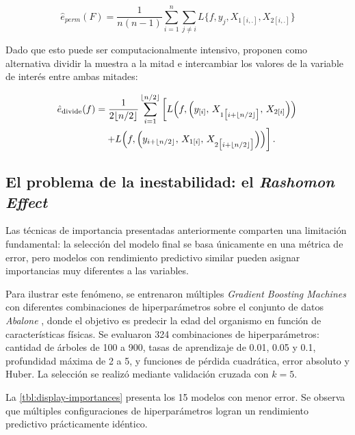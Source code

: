 \begin{equation}
    \hat{e}_{perm}(F) = \frac{1}{n(n-1)}\sum_{i=1}^n\sum_{j\neq i}L\{f,y_j,X_{1[i,.]},X_{2[i,.]} \}
\end{equation}

Dado que esto puede ser computacionalmente intensivo, proponen como alternativa dividir la muestra a la mitad e intercambiar los valores de la variable de interés entre ambas mitades:

\begin{equation}
    \begin{aligned}
    \hat{e}_{\text{divide}}(f) &= \frac{1}{2 \lfloor n/2 \rfloor} \sum_{i=1}^{\lfloor n/2 \rfloor} \left[
    L\Bigl(f,\Bigl(y_{[i]},\, X_{1\bigl[i+\lfloor n/2 \rfloor\bigr]},\, X_{2[i]}\Bigr)\Bigr) \right. \\
    &\left. \quad + L\Bigl(f,\Bigl(y_{i+\lfloor n/2 \rfloor},\, X_{1[i]},\, X_{2\bigl[i+\lfloor n/2 \rfloor\bigr]}\Bigr)\Bigr)
    \right]. \\
    \end{aligned}    
\end{equation}

\subsection{El problema de la inestabilidad: el \textit{Rashomon Effect}}

Las técnicas de importancia presentadas anteriormente comparten una limitación fundamental: la selección del modelo final se basa únicamente en una métrica de error, pero modelos con rendimiento predictivo similar pueden asignar importancias muy diferentes a las variables.

Para ilustrar este fenómeno, se entrenaron múltiples \textit{Gradient Boosting Machines} con diferentes combinaciones de hiperparámetros sobre el conjunto de datos \textit{Abalone} \cite{abalone_1}, donde el objetivo es predecir la edad del organismo en función de características físicas. Se evaluaron 324 combinaciones de hiperparámetros: cantidad de árboles de 100 a 900, tasas de aprendizaje de 0.01, 0.05 y 0.1, profundidad máxima de 2 a 5, y funciones de pérdida cuadrática, error absoluto y Huber. La selección se realizó mediante validación cruzada con $k=5$.

La \autoref{tbl:display-importances} presenta los 15 modelos con menor error. Se observa que múltiples configuraciones de hiperparámetros logran un rendimiento predictivo prácticamente idéntico.


